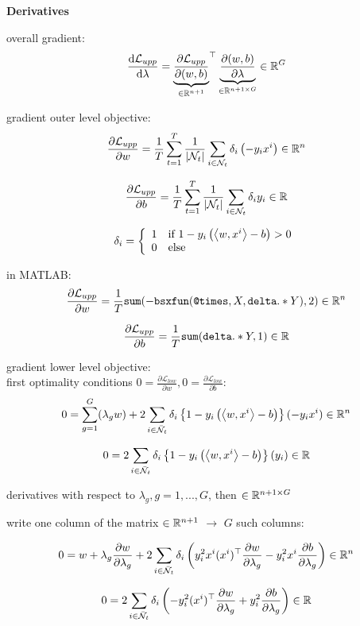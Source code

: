 \textbf{Derivatives}

overall gradient:
	\[ \frac{\textup{d}\mathcal{L}_{upp}}{\textup{d}\lambda} = {\underbrace{\frac{\partial \mathcal{L}_{upp}}{\partial (w,b)}}_{\in \mathbb{R}^{n+1}}} ^{\top} \underbrace{\frac{\partial (w,b)}{\partial \lambda}}_{\in \mathbb{R}^{n+1 \times G}} \in \mathbb{R}^G\]


gradient outer level objective: 
	\[ \frac{\partial \mathcal{L}_{upp}}{\partial w} = \frac{1}{T}\sum_{t=1}^T\frac{1}{|\mathcal{N}_t|}\sum_{i \in \mathcal{N}_t} \delta_i \left( -y_i x^i\right) \in \mathbb{R}^n\]
	
	\[ \frac{\partial \mathcal{L}_{upp}}{\partial b} = \frac{1}{T}\sum_{t=1}^T\frac{1}{|\mathcal{N}_t|}\sum_{i \in \mathcal{N}_t} \delta_i y_i \in \mathbb{R}\]
	
	\[ \delta_i = \left\{ \begin{array}{cl} 1 & \text{if } 1-y_i\left(\left\langle w,x^i\right\rangle-b\right) > 0 \\
		0 & \text{else}\end{array} \right.\]


in MATLAB: 
	\[ \frac{\partial \mathcal{L}_{upp}}{\partial w} = \frac{1}{T}\texttt{sum}(-\texttt{bsxfun}(\texttt{@times},X,\texttt{delta}.*Y) ,2) \in \mathbb{R}^n\]
	
	\[ \frac{\partial \mathcal{L}_{upp}}{\partial b} = \frac{1}{T}\texttt{sum}(\texttt{delta}.*Y ,1) \in \mathbb{R}\]
	
	
gradient lower level objective:\\
first optimality conditions \(0 = \frac{\partial \mathcal{L}_{low}}{\partial w}, 0 = \frac{\partial \mathcal{L}_{low}}{\partial b}\):
	\[ 0 = {\sum_{g = 1}^G(\lambda_g}w) + 2\sum_{i \in \bar{\mathcal{N}}_t}\delta_i \left\{1-y_i\left(\left\langle w,x^i\right\rangle -b\right) \right\}(-y_ix^i) \in \mathbb{R}^n \]
		
	\[0 = 2\sum_{i \in \bar{\mathcal{N}}_t}\delta_i \left\{1-y_i\left(\left\langle w,x^i\right\rangle -b\right) \right\}(y_i) \in \mathbb{R} \]
	
	derivatives with respect to \(\lambda_g, g = 1,...,G\), then \(\in \mathbb{R}^{n+1 \times G}\)
	
	write one column of the matrix \(\in \mathbb{R}^{n+1}\) \(\to\) \(G\) such columns:
	
	\[ 0 = w + \lambda_g\frac{\partial w}{\partial \lambda_g} + 2 \sum_{i \in  \bar{\mathcal{N}}_t} \delta_i \left(y_i^2x^i(x^i)^{\top}\frac{\partial w}{\partial \lambda_g} - y_i^2x^i \frac{\partial b}{\partial \lambda_g}\right) \in \mathbb{R}^n \]
	
	\[ 0 = 2\sum_{i \in  \bar{\mathcal{N}}_t} \delta_i \left(-y_i^2(x^i)^{\top} \frac{\partial w}{\partial \lambda_g} + y_i^2 \frac{\partial b}{\partial \lambda_g}\right) \in \mathbb{R}\] 


